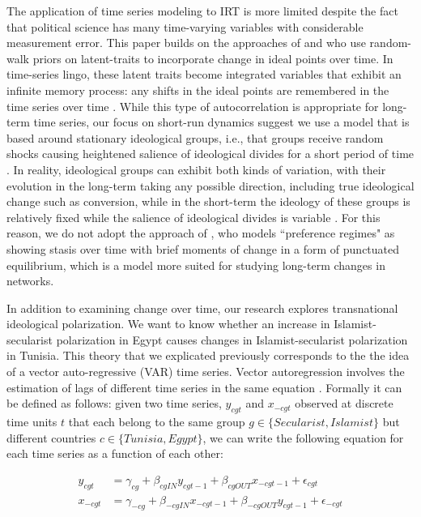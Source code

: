 \documentclass[12pt]{article}
\begin{document}
The application of time series modeling to IRT is more limited despite the fact that political science has many time-varying variables with considerable measurement error. This paper builds on the approaches of \textcite{quinn2002} and \textcite{kropko2013} who use random-walk priors on latent-traits to incorporate change in ideal points over time. In time-series lingo, these latent traits become integrated variables that exhibit an infinite memory process: any shifts in the ideal points are remembered in the time series over time \parencite[Ch. 5]{timeseries2014}. While this type of autocorrelation is appropriate for long-term time series, our focus on short-run dynamics suggest we use a model that is based around stationary ideological groups, i.e., that groups receive random shocks causing heightened salience of ideological divides for a short period of time \parencite[Ch. 2]{timeseries2014}. In reality, ideological groups can exhibit both kinds of variation, with their evolution in the long-term taking any possible direction, including true ideological change such as conversion, while in the short-term the ideology of these groups is relatively fixed while the salience of ideological divides is variable \parencite{owen2010clash}. For this reason, we do not adopt the approach of \textcite{park2011}, who models ``preference regimes" as showing stasis over time with brief moments of change in a form of punctuated equilibrium, which is a model more suited for studying long-term changes in networks.

In addition to examining change over time, our research explores transnational ideological polarization. We want to know whether an increase in Islamist-secularist polarization in Egypt causes changes in Islamist-secularist polarization in Tunisia. This theory that we explicated previously corresponds to the the idea of a vector auto-regressive (VAR) time series. Vector autoregression involves the estimation of lags of different time series in the same equation \parencite{sims1980}. Formally it can be defined as follows: given two time series, $y_{cgt}$ and $x_{-cgt}$ observed at discrete time units $t$ that each belong to the same group $g \in \{Secularist, Islamist\}$ but different countries $c \in \{Tunisia, Egypt\}$, we can write the following equation for each time series as a function of each other:

\begin{align}\label{var}
	y_{cgt} &= \gamma_{cg} + \beta_{cgIN}y_{cgt-1} + \beta_{cgOUT}x_{-cgt-1} + \epsilon_{cgt}\\
	x_{-cgt} &= \gamma_{-cg} + \beta_{-cgIN}x_{-cgt-1} + \beta_{-cgOUT}y_{cgt-1} + \epsilon_{-cgt}
\end{align}
\end{document}
